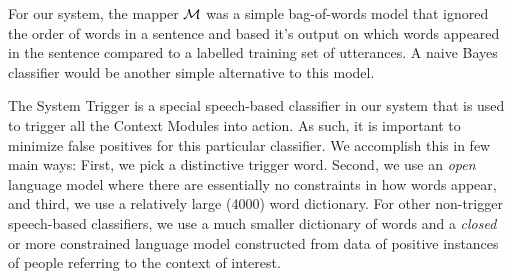 \documentclass{llncs}
\begin{document}
For our system, the mapper $\cal{M}$ was a simple bag-of-words model
that ignored the order of words in a sentence and based it's output on
which words appeared in the sentence compared to a labelled training
set of utterances. A naive Bayes classifier would be another simple
alternative to this model.

The System Trigger is a special speech-based classifier in our system
that is used to trigger all the Context Modules into action. As such,
it is important to minimize false positives for this particular
classifier.  We accomplish this in few main ways: First, we pick a distinctive trigger word. Second, we use an {\em open} language model
where there are essentially no constraints in how words appear, and
third, we use a relatively large (4000) word dictionary. For other
non-trigger speech-based classifiers, we use a much smaller dictionary
of words and a {\em closed} or more constrained language model
constructed from data of positive instances of people referring to the
context of interest.




\end{document}
